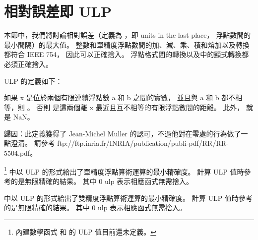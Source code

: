 \section[sec:relativeError]{相對誤差即 ULP}

本節中，我們將討論相對誤差（定義為 ，即 units in the last place，
浮點數間的最小間隔）的最大值。
整數和單精度浮點數間的加、減、乘、積和熔加以及轉換都符合 IEEE 754，
因此可以正確捨入。
浮點格式間的轉換以及中的顯式轉換都必須正確捨入。

ULP 的定義如下：

{\ftRef%
如果 x 是位於兩個有限連續浮點數 a 和 b 之間的實數，
並且與 a 和 b 都不相等，則 。
否則  是這兩個離 x 最近且互不相等的有限浮點數間的距離。
此外，  就是 NaN。}

{\ftRef%
歸因：此定義獲得了 Jean-Michel Muller 的認可，不過他對在零處的行為做了一點澄清。
請參考 ftp://ftp.inria.fr/INRIA/publication/publi-pdf/RR/RR-5504.pdf。}

\footnote{%
內建數學函式  和  的 ULP 值目前還未定義。}%
中以 ULP 的形式給出了單精度浮點算術運算的最小精確度。
計算 ULP 值時參考的是無限精確的結果。
其中 0 ulp 表示相應函式無需捨入。

{}

中以 ULP 的形式給出了雙精度浮點算術運算的最小精確度。
計算 ULP 值時參考的是無限精確的結果。
其中 0 ulp 表示相應函式無需捨入。

{}
